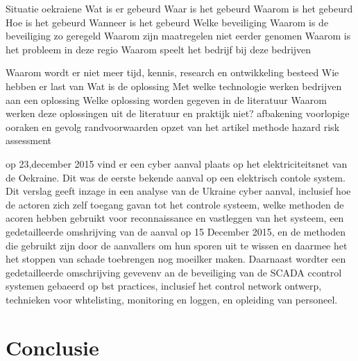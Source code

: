 Situatie oekraiene
Wat is er gebeurd
Waar is het gebeurd
Waarom is het gebeurd
Hoe is het gebeurd
Wanneer is het gebeurd
Welke beveiliging
Waarom is de beveiliging zo geregeld
Waarom zijn maatregelen niet eerder genomen
Waarom is het probleem in deze regio
Waarom speelt het bedrijf bij deze bedrijven



Waarom wordt er niet meer tijd, kennis, research en ontwikkeling besteed
Wie hebben er last van
Wat is de oplossing
Met welke technologie werken bedrijven aan een oplossing
Welke oplossing worden gegeven in de literatuur
Waarom werken deze oplossingen uit de literatuur en praktijk niet?
afbakening
voorlopige ooraken en gevolg
randvoorwaarden
opzet van het artikel
methode hazard risk assessment

op 23,december 2015  vind er een cyber aanval plaats op het elektriciteitsnet van de Oekraine. Dit was de eerste bekende aanval op een elektrisch contole  system.  Dit verslag geeft inzage in een analyse van de Ukraine cyber aanval,
inclusief hoe de actoren zich zelf toegang gavan tot het controle systeem, welke methoden de acoren hebben gebruikt voor reconnaissance en vastleggen van het systeem, een gedetailleerde omshrijving van de aanval op 15 December 2015, en de methoden die gebruikt zijn door de aanvallers om hun sporen uit te wissen en daarmee het het stoppen van schade toebrengen  nog moeilker maken. Daarnaast wordter  een gedetailleerde omschrijving gevevenv an de beveiliging van de SCADA ccontrol systemen gebaeerd op bst practices, inclusief het control network ontwerp, technieken voor whtelisting, monitoring en loggen, en  opleiding van personeel.
\cite{Whitehead2017ukrainepoweroutage}

 \cite{noauthor_2022-nm}
\cite{zetter2016GridHack}



\cite{no}


\cite{}

\cite{}

\cite{}

\cite{}
\cite{}


\cite{}


\cite{}


\cite{}

\cite{}
 


\section{Conclusie}



